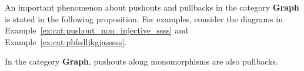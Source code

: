 An important phenomenon about pushouts and pullbacks in the category \textbf{Graph} is stated in the following proposition. For examples, consider the diagrams in Example~\ref{ex:cat:pushout_non_injective_ssss} and Example~\ref{ex:cat:pbfsdljkgjasssss}.
\begin{proposition}
    \label{prop:pb_eq_po}
    In the category \textbf{Graph}, pushouts along monomorphisms are also pullbacks. 
\end{proposition}
